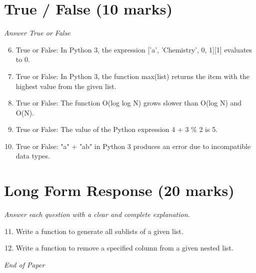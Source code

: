 \documentclass[12pt]{article}
\begin{document}
\section*{True / False (10 marks)}
\textit{Answer True or False}
\begin{enumerate}[label=\arabic*.]
\setcounter{enumi}{5}
\item True or False: In Python 3, the expression ['a', 'Chemistry', 0, 1][1] evaluates to 0.
\item True or False: In Python 3, the function max(list) returns the item with the highest value from the given list.
\item True or False: The function O(log log N) grows slower than O(log N) and O(N).
\item True or False: The value of the Python expression 4 + 3 \% 2 is 5.
\item True or False: "a" + "ab" in Python 3 produces an error due to incompatible data types.
\end{enumerate}

\section*{Long Form Response (20 marks)}
\textit{Answer each question with a clear and complete explanation.}
\begin{enumerate}[label=\arabic*.]
\setcounter{enumi}{10}
\item Write a function to generate all sublists of a given list.
\item Write a function to remove a specified column from a given nested list.
\end{enumerate}

\vfill
\noindent\textit{End of Paper}
\end{document}
